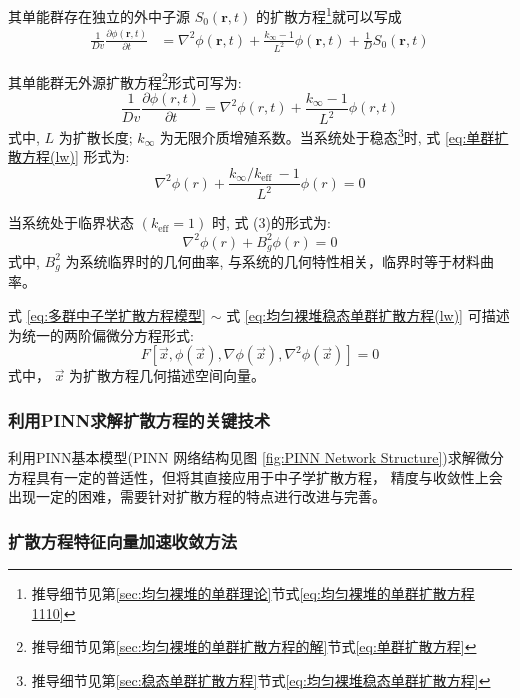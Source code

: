 \documentclass{Sichuan Normal University}
\begin{document}
其单能群存在独立的外中子源 $S_0(\boldsymbol{r}, t)$ 的扩散方程\footnote{推导细节见第\ref{sec:均匀裸堆的单群理论}节式\eqref{eq:均匀裸堆的单群扩散方程1110}}就可以写成
\begin{align}
\frac{1}{Dv} \frac{\partial \phi(\boldsymbol{r}, t)}{\partial t}&=\nabla^2 \phi(\boldsymbol{r}, t)+\frac{k_{\infty}-1}{L^2} \phi(\boldsymbol{r}, t)+\frac{1}{D}S_0(\boldsymbol{r}, t)
\end{align}

其单能群无外源扩散方程\footnote{推导细节见第\ref{sec:均匀裸堆的单群扩散方程的解}节式\eqref{eq:单群扩散方程}}形式可写为:
\begin{equation}
\frac{1}{D v} \frac{\partial \phi(r, t)}{\partial t}=\nabla^2 \phi(r, t)+\frac{k_{\infty}-1}{L^2} \phi(r, t)
\label{eq:单群扩散方程(lw)}
\end{equation}
式中, $L$ 为扩散长度; $k_{\infty}$ 为无限介质增殖系数。当系统处于稳态\footnote{推导细节见第\ref{sec:稳态单群扩散方程}节式\eqref{eq:均匀裸堆稳态单群扩散方程}}时, 式 \eqref{eq:单群扩散方程(lw)} 形式为:
\begin{equation}
\nabla^2 \phi(r)+\frac{k_{\infty} / k_{\text {eff }}-1}{L^2} \phi(r)=0
\label{eq:均匀裸堆稳态单群扩散方程(lw)}
\end{equation}

当系统处于临界状态 $\left(k_{\mathrm{eff}}=1\right)$ 时, 式 (3)的形式为:
\begin{equation}
\nabla^2 \phi(r)+B_g^2 \phi(r)=0
\end{equation}
式中, $B_g^2$ 为系统临界时的几何曲率, 与系统的几何特性相关，临界时等于材料曲率。

式 \eqref{eq:多群中子学扩散方程模型}  $\sim$ 式 \eqref{eq:均匀裸堆稳态单群扩散方程(lw)} 可描述为统一的两阶偏微分方程形式:
\begin{equation}
F\left[\vec{x}, \phi(\vec{x}), \nabla \phi(\vec{x}), \nabla^2 \phi(\vec{x})\right]=0
\end{equation}
式中， $\vec{x}$ 为扩散方程几何描述空间向量。

\subsubsection{利用PINN求解扩散方程的关键技术}
利用PINN基本模型(PINN 网络结构见图 \ref{fig:PINN Network Structure})求解微分方程具有一定的普适性，但将其直接应用于中子学扩散方程， 精度与收敛性上会出现一定的困难，需要针对扩散方程的特点进行改进与完善。
\subsubsection{扩散方程特征向量加速收敛方法}
\end{document}
